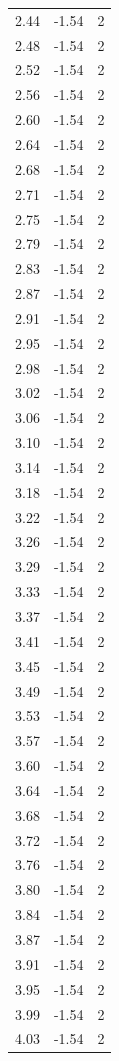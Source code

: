 \begin{longtable}{lrr}
  2.44 & -1.54 & 2 \\
  2.48 & -1.54 & 2 \\
  2.52 & -1.54 & 2 \\
  2.56 & -1.54 & 2 \\
  2.60 & -1.54 & 2 \\
  2.64 & -1.54 & 2 \\
  2.68 & -1.54 & 2 \\
  2.71 & -1.54 & 2 \\
  2.75 & -1.54 & 2 \\
  2.79 & -1.54 & 2 \\
  2.83 & -1.54 & 2 \\
  2.87 & -1.54 & 2 \\
  2.91 & -1.54 & 2 \\
  2.95 & -1.54 & 2 \\
  2.98 & -1.54 & 2 \\
  3.02 & -1.54 & 2 \\
  3.06 & -1.54 & 2 \\
  3.10 & -1.54 & 2 \\
  3.14 & -1.54 & 2 \\
  3.18 & -1.54 & 2 \\
  3.22 & -1.54 & 2 \\
  3.26 & -1.54 & 2 \\
  3.29 & -1.54 & 2 \\
  3.33 & -1.54 & 2 \\
  3.37 & -1.54 & 2 \\
  3.41 & -1.54 & 2 \\
  3.45 & -1.54 & 2 \\
  3.49 & -1.54 & 2 \\
  3.53 & -1.54 & 2 \\
  3.57 & -1.54 & 2 \\
  3.60 & -1.54 & 2 \\
  3.64 & -1.54 & 2 \\
  3.68 & -1.54 & 2 \\
  3.72 & -1.54 & 2 \\
  3.76 & -1.54 & 2 \\
  3.80 & -1.54 & 2 \\
  3.84 & -1.54 & 2 \\
  3.87 & -1.54 & 2 \\
  3.91 & -1.54 & 2 \\
  3.95 & -1.54 & 2 \\
  3.99 & -1.54 & 2 \\
  4.03 & -1.54 & 2 \\

\end{longtable}
